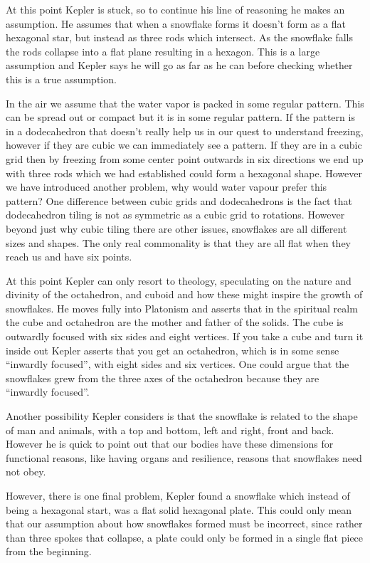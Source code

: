 \documentclass{report}
\begin{document}
At this point Kepler is stuck, so to continue his line of reasoning he makes an assumption. He assumes that when a snowflake forms 
it doesn’t form as a flat hexagonal star, but instead as three rods which intersect. As the snowflake falls the rods collapse into
a flat plane resulting in a hexagon. This is a large assumption and Kepler says he will go as far as he can before checking whether
this is a true assumption. 

In the air we assume that the water vapor is packed in some regular pattern. This can be spread out or compact but it is in some 
regular pattern. If the pattern is in a dodecahedron that doesn’t really help us in our quest to understand freezing, however if 
they are cubic we can immediately see a pattern. If they are in a cubic grid then by freezing from some center point outwards in 
six directions we end up with three rods which we had established could form a hexagonal shape. However we have introduced another 
problem, why would water vapour prefer this pattern? One difference between cubic grids and dodecahedrons is the fact that 
dodecahedron tiling is not as symmetric as a cubic grid to rotations. However beyond just why cubic tiling there are other issues, 
snowflakes are all different sizes and shapes. The only real commonality is that they are all flat when they reach us and have 
six points. 

At this point Kepler can only resort to theology, speculating on the nature and divinity of the octahedron, and cuboid and how 
these might inspire the growth of snowflakes. He moves fully into Platonism and asserts that in the spiritual realm the cube and 
octahedron are the mother and father of the solids. The cube is outwardly focused with six sides and eight vertices. If you take a 
cube and turn it inside out Kepler asserts that you get an octahedron, which is in some sense “inwardly focused”, with eight sides 
and six vertices. One could argue that the snowflakes grew from the three axes of the octahedron because they are “inwardly focused”. 

Another possibility Kepler considers is that the snowflake is related to the shape of man and animals, with a top and bottom, left 
and right, front and back. However he is quick to point out that our bodies have these dimensions for functional reasons, like 
having organs and resilience, reasons that snowflakes need not obey.

However, there is one final problem, Kepler found a snowflake which instead of being a hexagonal start, was a flat solid hexagonal 
plate. This could only mean that our assumption about how snowflakes formed must be incorrect, since rather than three spokes that 
collapse, a plate could only be formed in a single flat piece from the beginning.
\end{document}
